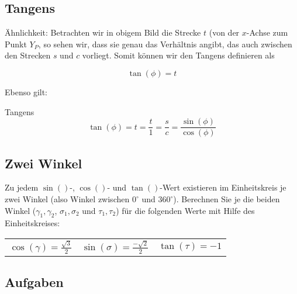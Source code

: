 \newpage
\subsection{Tangens}

\einheitskreis{}
Ähnlichkeit: 
Betrachten wir in obigem Bild die Strecke $t$ (von der $x$-Achse zum
Punkt $Y_P$, so sehen wir, dass sie genau das Verhältnis angibt, das
auch zwischen den Strecken $s$ und $c$ vorliegt. 
Somit können wir den Tangens definieren als

$$\tan(\phi) = t$$

Ebenso gilt:
\begin{gesetz}{Tangens}{}
$$\tan(\phi) = t = \frac{t}{1} =  \frac{s}{c} = \frac{\sin(\phi)}{\cos(\phi)}$$
\end{gesetz}


\subsection{Zwei Winkel}
Zu jedem $\sin()$-, $\cos()$- und $\tan()$-Wert existieren im
Einheitskreis je zwei Winkel (also Winkel zwischen $0^{\circ{}}$ und
$360^{\circ{}}$). Berechnen Sie je die beiden Winkel ($\gamma_1, \gamma_2$,
$\sigma_1, \sigma_2$ und $\tau_1, \tau_2$) für die folgenden Werte mit Hilfe des
Einheitskreises:


\begin{tabular}{|c|c|c|}
  $\cos(\gamma)=\frac{\sqrt{3}}{2}$ & $\sin(\sigma) = \frac{-\sqrt{2}}{2}$ & $\tan(\tau) = -1$\\
\end{tabular}

\newpage


\subsection*{Aufgaben}


\newpage
